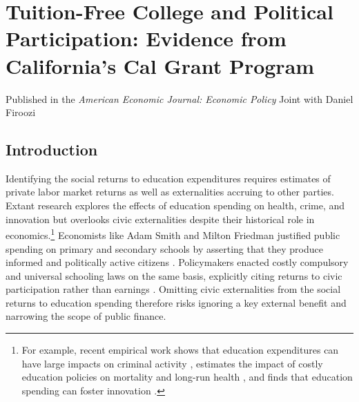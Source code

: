 \documentclass[12pt,letterpaper,oneside]{book}
\newcommand{\mychapter}[1]{
    \chapter{#1}
    \doublespacing
}
\begin{document}
\mychapter{Tuition-Free College and Political Participation: Evidence from California's Cal Grant Program}
\vspace{0.15in}
\noindent Published in the \textit{American Economic Journal: Economic Policy} Joint with Daniel Firoozi
\vspace{0.15in}
\label{chap:calgrant}

\providecommand{\sym}[1]{\ifmmode^{#1}\else\(^{#1}\)\fi}

\section{Introduction} \label{sec:introduction}

Identifying the social returns to education expenditures requires estimates of private labor market returns as well as externalities accruing to other parties. Extant research explores the effects of education spending on health, crime, and innovation but overlooks civic externalities despite their historical role in economics.\footnote{For example, recent empirical work shows that education expenditures can have large impacts on criminal activity \citep{bell_why_2022,anders_effect_2023,gray-lobe_long-term_2023,baron_public_2024}, estimates the impact of costly education policies on mortality and long-run health \citep{clark_effect_2013,meghir_education_2018,lundborg_long-term_2022}, and finds that education spending can foster innovation \citep{toivanen_education_2016,andrews_how_2023,babina_cutting_2023}.} Economists like Adam Smith and Milton Friedman justified public spending on primary and secondary schools by asserting that they produce informed and politically active citizens \citep{friedman_capitalism_2020,frame_adam_2022}. Policymakers enacted costly compulsory and universal schooling laws on the same basis, explicitly citing returns to civic participation rather than earnings \citep{mann_republic_1957}. Omitting civic externalities from the social returns to education spending therefore risks ignoring a key external benefit and narrowing the scope of public finance.
\end{document}
